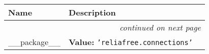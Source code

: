     \vspace{-1cm}
\hspace{\varindent}\begin{longtable}{|p{\varnamewidth}|p{\vardescrwidth}|l}
\cline{1-2}
\cline{1-2} \centering \textbf{Name} & \centering \textbf{Description}& \\
\cline{1-2}
\endhead\cline{1-2}\multicolumn{3}{r}{\small\textit{continued on next page}}\\\endfoot\cline{1-2}
\endlastfoot\raggedright \_\-\_\-p\-a\-c\-k\-a\-g\-e\-\_\-\_\- & \raggedright \textbf{Value:} 
{\tt \texttt{'}\texttt{reliafree.connections}\texttt{'}}&\\
\cline{1-2}
\end{longtable}

